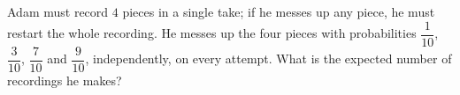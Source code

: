 Adam must record $4$ pieces in a single take; if he messes up any piece, he must restart the whole recording. He messes up the four pieces with probabilities $\dfrac1{10}$, $\dfrac3{10}$, $\dfrac7{10}$ and $\dfrac9{10}$, independently, on every attempt. What is the expected number of recordings he makes?
